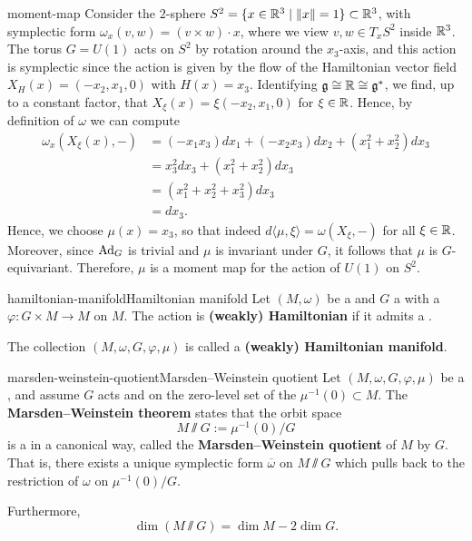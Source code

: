 \begin{example}{moment-map}
    Consider the $2$-sphere $S^2 = \{ x \in \mathbb{R}^3 \mid \left\|x\right\| = 1 \} \subset \mathbb{R}^3$, with symplectic form $\omega_x(v, w) = (v \times w) \cdot x$, where we view $v, w \in T_x S^2$ inside $\mathbb{R}^3$. The torus $G = U(1)$ acts on $S^2$ by rotation around the $x_3$-axis, and this action is symplectic since the action is given by the flow of the Hamiltonian vector field $X_H(x) = (-x_2, x_1, 0)$ with $H(x) = x_3$. Identifying $\mathfrak{g} \cong \mathbb{R} \cong \mathfrak{g}^*$, we find, up to a constant factor, that $X_\xi(x) = \xi (-x_2, x_1, 0)$ for $\xi \in \mathbb{R}$. Hence, by definition of $\omega$ we can compute
    \[ \begin{aligned}
        \omega_x(X_\xi(x), -)
            &= (-x_1 x_3) dx_1 + (-x_2 x_3) dx_2 + (x_1^2 + x_2^2) dx_3 \\
            &= x_3^2 dx_3 + (x_1^2 + x_2^2) dx_3 \\
            &= (x_1^2 + x_2^2 + x_3^2) dx_3 \\
            &= dx_3 .
    \end{aligned} \]
    Hence, we choose $\mu(x) = x_3$, so that indeed $d \langle \mu, \xi \rangle = \omega(X_\xi, -)$ for all $\xi \in \mathbb{R}$. Moreover, since $\textup{Ad}_G$ is trivial and $\mu$ is invariant under $G$, it follows that $\mu$ is $G$-equivariant. Therefore, $\mu$ is a moment map for the action of $U(1)$ on $S^2$.
\end{example}

\begin{topic}{hamiltonian-manifold}{Hamiltonian manifold}
    Let $(M, \omega)$ be a  and $G$ a  with a  $\varphi \colon G \times M \to M$ on $M$. The action is \textbf{(weakly) Hamiltonian} if it admits a .
    
    The collection $(M, \omega, G, \varphi, \mu)$ is called a \textbf{(weakly) Hamiltonian manifold}.
\end{topic}

\begin{topic}{marsden-weinstein-quotient}{Marsden--Weinstein quotient}
    Let $(M, \omega, G, \varphi, \mu)$ be a , and assume $G$ acts  and  on the zero-level set of the  $\mu^{-1}(0) \subset M$. The \textbf{Marsden--Weinstein theorem} states that the orbit space
    \[ M \sslash G := \mu^{-1}(0) / G \]
    is a  in a canonical way, called the \textbf{Marsden--Weinstein quotient} of $M$ by $G$. That is, there exists a unique symplectic form $\overline{\omega}$ on $M \sslash G$ which pulls back to the restriction of $\omega$ on $\mu^{-1}(0) / G$.
    
    Furthermore,
    \[ \dim(M \sslash G) = \dim M - 2 \dim G . \]
\end{topic}

